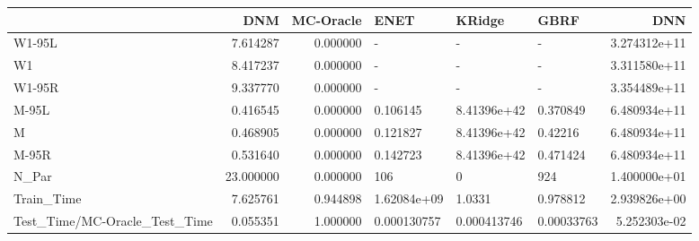 \begin{tabular}{lrrlllr}
\toprule
{} &        DNM &  MC-Oracle &         ENET &       KRidge &        GBRF &           DNN \\
\midrule
W1-95L                        &   7.614287 &   0.000000 &            - &            - &           - &  3.274312e+11 \\
W1                            &   8.417237 &   0.000000 &            - &            - &           - &  3.311580e+11 \\
W1-95R                        &   9.337770 &   0.000000 &            - &            - &           - &  3.354489e+11 \\
M-95L                         &   0.416545 &   0.000000 &     0.106145 &  8.41396e+42 &    0.370849 &  6.480934e+11 \\
M                             &   0.468905 &   0.000000 &     0.121827 &  8.41396e+42 &     0.42216 &  6.480934e+11 \\
M-95R                         &   0.531640 &   0.000000 &     0.142723 &  8.41396e+42 &    0.471424 &  6.480934e+11 \\
N\_Par                         &  23.000000 &   0.000000 &          106 &            0 &         924 &  1.400000e+01 \\
Train\_Time                    &   7.625761 &   0.944898 &  1.62084e+09 &       1.0331 &    0.978812 &  2.939826e+00 \\
Test\_Time/MC-Oracle\_Test\_Time &   0.055351 &   1.000000 &  0.000130757 &  0.000413746 &  0.00033763 &  5.252303e-02 \\
\bottomrule
\end{tabular}
